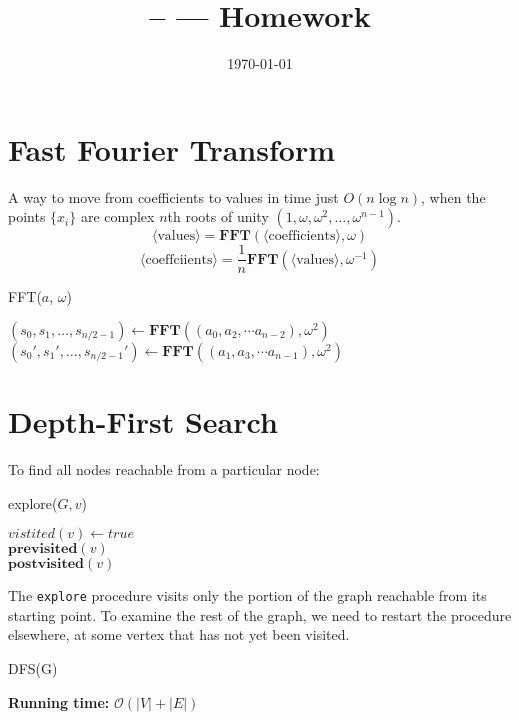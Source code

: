 \documentclass[11pt]{article}
\title{\Class-- \Session --- Homework \Homework}
\author{\Name}
\date{\today}
\begin{document}
	\maketitle
	
	\section*{Fast Fourier Transform}
	A way to move from coefficients to values in time just $O(n\log n)$, when the points $\{x_i\}$ are complex $n$th roots of unity $(1, \omega, \omega^2, \dots , \omega^{n-1})$.
	$$\langle\text{values}\rangle = \mathbf{FFT}(\langle\text{coefficients}\rangle, \omega)$$
	$$\langle\text{coeffciients}\rangle = \frac{1}{n} \mathbf{FFT}(\langle\text{values}\rangle, \omega^{-1})$$
	\begin{algorithm}[H]
		\caption{FFT($a$, $\omega$)}
		
		$(s_0, s_1, \dots, s_{n/2-1}) \leftarrow \mathbf{FFT}((a_0, a_2, \dotsm a_{n-2}), \omega^2)$\\
		$(s_0', s_1', \dots, s_{n/2-1}') \leftarrow \mathbf{FFT}((a_1, a_3, \dotsm a_{n-1}), \omega^2)$\\
	\end{algorithm}
	
	\vspace{0.7cm}
	
	\section*{Depth-First Search}
	To find all nodes reachable from a particular node:\\
	\begin{algorithm}[H]
		\caption{explore($G, v$)}
		
		$vistited(v) \leftarrow true$\\
		$\mathbf{previsited}(v)$\\
		$\mathbf{postvisited}(v)$
	\end{algorithm}
	The \texttt{explore} procedure visits only the portion of the graph reachable from its starting point. To examine the rest of the graph, we need to restart the procedure elsewhere, at some vertex that has not yet been visited.\\
	\begin{algorithm}[H]
		\caption{DFS(G)}
		
	\end{algorithm}
	\textbf{Running time: } $\mathcal{O}(|V| + |E|)$
	
\end{document}
